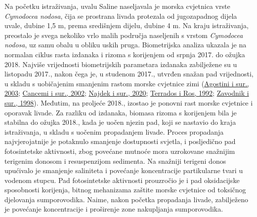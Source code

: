 \documentclass[
  12 pt,
]{book}
\begin{document}
{Na početku istraživanja, uvalu Saline naseljavala je morska cvjetnica vrste \emph{Cymodocea nodosa}, čija se prostrana livada protezala od jugozapadnog dijela uvale, dubine 1,5 \si{\m}, prema središnjem dijelu, dubine 4 \si{\m}. Na kraju istraživanja, preostalo je svega nekoliko vrlo malih područja naseljenih s vrstom \emph{Cymodocea nodosa}, uz samu obalu u obliku uskih pruga. Biometrijska analiza ukazala je na normalan ciklus rasta izdanaka i rizoma s korijenjem od srpnja 2017. do ožujka 2018. Najviše vrijednosti biometrijskih parametara izdanaka zabilježene su u listopadu 2017., nakon čega je, u studenom 2017., utvrđen snažan pad vrijednosti, u skladu s uobičajenim smanjenim rastom morske cvjetnice zimi (\protect\hyperlink{ref-Agostini2003}{Agostini i sur., 2003}; \protect\hyperlink{ref-Cancemi2002}{Cancemi i sur., 2002}; \protect\hyperlink{ref-Najdek2020a}{Najdek i sur., 2020}; \protect\hyperlink{ref-Terrados1992}{Terrados i Ros, 1992}; \protect\hyperlink{ref-Zavodnik1998}{Zavodnik i sur., 1998}). Međutim, na proljeće 2018., izostao je ponovni rast morske cvjetnice i oporavak livade. Za razliku od izdanaka, biomasa rizoma s korijenjem bila je stabilna do ožujka 2018., kada je uočen njezin pad, koji se nastavio do kraja istraživanja, u skladu s uočenim propadanjem livade. Proces propadanja najvjerojatnije je potaknulo smanjenje dostupnosti svjetla, i posljedično pad fotosintetske aktivnosti, zbog povećane mutnoće mora uzrokovane snažnijim terigenim donosom i resuspenzijom sedimenta. Na snažniji terigeni donos upućivalo je smanjenje saliniteta i povećanje koncentracije partikularne tvari u vodenom stupcu. Pad fotosintetske aktivnosti prouzročio je i pad oksidacijske sposobnosti korijenja, bitnog mehanizama zaštite morske cvjetnice od toksičnog djelovanja sumporovodika. Naime, nakon početka propadanja livade, zabilježeno je povećanje koncentracije i proširenje zone nakupljanja sumporovodika.

}
\end{document}
